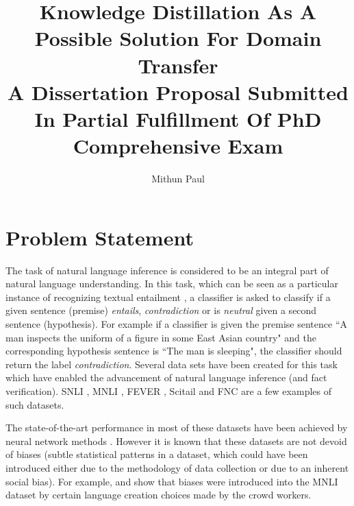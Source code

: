 \documentclass{article}
\begin{document}
\title{Knowledge Distillation As A Possible Solution For Domain Transfer  \\
\large{A Dissertation Proposal Submitted In Partial Fulfillment Of PhD Comprehensive Exam \\
}}
\author{Mithun Paul\\}



\maketitle

\tableofcontents

\section{Problem Statement}


The task of natural language inference is considered to be an integral part of natural language understanding. In this task, which can be seen as a particular instance of recognizing textual entailment \citep*{fyodorov2000natural,condoravdi2003entailment,bos2005recognising,maccartney2009extended,dagan2013recognizing}, a classifier is asked to classify if a given sentence (premise) \textit{entails}, \textit{contradiction} or is \textit{neutral} given a second sentence (hypothesis). For example if a classifier is given the premise sentence ``A man inspects the uniform of a figure in some East Asian country" and the corresponding hypothesis sentence is ``The man is sleeping", the classifier should return the label  \textit{contradiction}. Several data sets have been created for this task which have enabled the advancement of natural language inference (and fact verification).  SNLI \citep*{bowman2015large}, MNLI \citep*{williams2017broad}, FEVER \citep*{thorne2018fever}, Scitail\citep*{khot2018scitail} and FNC \citep*{pomerleau2017fake} are a few examples of such datasets. 



The state-of-the-art  performance in most of these datasets have been achieved by  neural network methods \citep*{kim2018semantic,chen2016enhanced,liu2019multi}. However it is known that these datasets are not devoid of biases (subtle statistical patterns in a dataset, which could have been introduced either due to the methodology of data collection or due to an inherent social bias). For example, \citep*{gururangan2018annotation} and \citep*{poliak2018hypothesis} show that biases were introduced into the MNLI dataset by certain language creation choices made by the crowd workers. 
\end{document}
